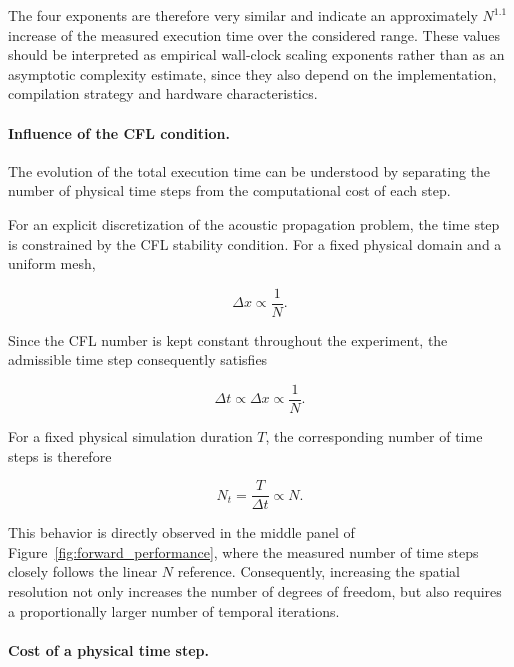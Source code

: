 \documentclass[11pt,a4paper]{report}
\theoremstyle{plain}
\theoremstyle{definition}
\begin{document}
The four exponents are therefore very similar and indicate an approximately
$N^{1.1}$ increase of the measured execution time over the considered range.
These values should be interpreted as empirical wall-clock scaling exponents
rather than as an asymptotic complexity estimate, since they also depend on
the implementation, compilation strategy and hardware characteristics.


\paragraph{Influence of the CFL condition.}

The evolution of the total execution time can be understood by separating the
number of physical time steps from the computational cost of each step.

For an explicit discretization of the acoustic propagation problem, the time
step is constrained by the CFL stability condition. For a fixed physical
domain and a uniform mesh,

\begin{equation}
    \Delta x \propto \frac{1}{N}.
\end{equation}

Since the CFL number is kept constant throughout the experiment, the admissible
time step consequently satisfies

\begin{equation}
    \Delta t \propto \Delta x
    \propto \frac{1}{N}.
\end{equation}

For a fixed physical simulation duration $T$, the corresponding number of time
steps is therefore

\begin{equation}
    N_t
    =
    \frac{T}{\Delta t}
    \propto N.
\end{equation}

This behavior is directly observed in the middle panel of
Figure~\ref{fig:forward_performance}, where the measured number of time steps
closely follows the linear $N$ reference. Consequently, increasing the spatial
resolution not only increases the number of degrees of freedom, but also
requires a proportionally larger number of temporal iterations.


\paragraph{Cost of a physical time step.}
\end{document}
